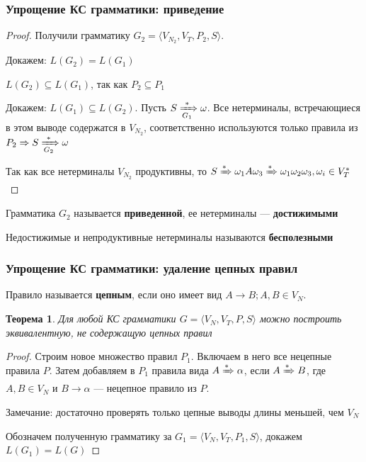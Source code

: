 \documentclass{beamer}
\newtheorem{rutheorem}{Теорема}
\newcommand{\derive}[0]{\xRightarrow[]{*}}
\newcommand{\deriveg}[1]{\xRightarrow[#1]{*}}
\begin{document}
\begin{frame}[fragile]
  \transwipe[direction=90]
  \frametitle{Упрощение КС грамматики: приведение}
   \begin{proof}
   Получили грамматику $G_2 = \langle V_{N_2}, V_T, P_2, S\rangle$. 

   Докажем: $L(G_2) = L(G_1)$
   
   $L(G_2) \subseteq L(G_1)$, так как $P_2 \subseteq P_1$
   
   Докажем: $L(G_1) \subseteq L(G_2)$. Пусть $S \deriveg{G_1} \omega$. Все нетерминалы, встречающиеся в этом выводе содержатся в $V_{N_2}$, соответственно используются только правила из $ P_2 \Rightarrow S \deriveg{G_2} \omega $
   
   Так как все нетерминалы $V_{N_2}$ продуктивны, то  $S \derive \omega_1 A \omega_3 \derive \omega_1 \omega_2 \omega_3, \omega_i \in V_T^*$
   
   
   \end{proof}
   
   Грамматика $G_2$ называется \textbf{приведенной}, ее нетерминалы --- \textbf{достижимыми}
   
   Недостижимые и непродуктивные нетерминалы называются \textbf{бесполезными}
\end{frame}

\begin{frame}[fragile]
  \transwipe[direction=90]
  \frametitle{Упрощение КС грамматики: удаление цепных правил}
  Правило называется \textbf{цепным}, если оно имеет вид $A \rightarrow B; A, B \in V_N$.
  
  \begin{rutheorem}
    Для любой КС грамматики $G=\langle V_N, V_T, P, S \rangle$ можно построить эквивалентную, не содержащую цепных правил
  \end{rutheorem}
  
   \begin{proof}
   Строим новое множество правил $P_1$. Включаем в него все нецепные правила  $P$. Затем добавляем в $P_1$ правила вида $A \derive \alpha$, если $A \derive B$, где $A, B \in V_N$ и $B \rightarrow \alpha$ --- нецепное правило из $P$.
   
   Замечание: достаточно проверять только цепные выводы длины меньшей, чем $V_N$
   
   Обозначем полученную грамматику за $G_1=\langle V_N, V_T, P_1, S \rangle$, докажем $L(G_1)=L(G)$
      \end{proof}
\end{frame} 
   
\end{document}
